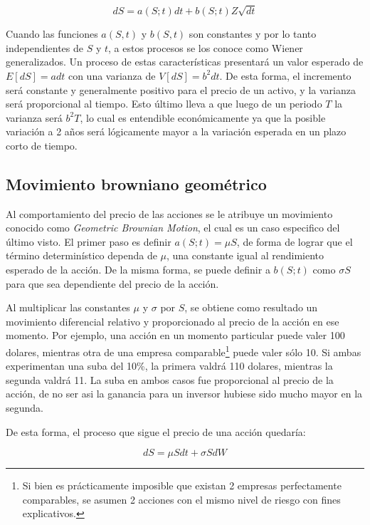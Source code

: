 \begin{equation}
	dS = a(S;t) dt + b(S;t) Z \sqrt{dt} \label{ito-dw}
\end{equation}

Cuando las funciones $a(S,t)$ y $b(S,t)$ son constantes y por lo tanto independientes de $S$ y $t$, a estos procesos se los conoce como Wiener generalizados. Un proceso de estas características presentará un valor esperado de $E[dS] = a dt$ con una varianza de $V[dS] = b^2 dt$. De esta forma, el incremento será constante y generalmente positivo para el precio de un activo, y la varianza será proporcional al tiempo. Esto último lleva a que luego de un periodo $T$ la varianza será $b^2 T$, lo cual es entendible económicamente ya que la posible variación a 2 años será lógicamente mayor a la variación esperada en un plazo corto de tiempo.



\subsection{Movimiento browniano geométrico}

Al comportamiento del precio de las acciones se le atribuye un movimiento conocido como \textit{Geometric Brownian Motion}, el cual es un caso especifico del último visto. El primer paso es definir $a(S;t) = \mu S$, de forma de lograr que el término determinístico dependa de $\mu$, una constante igual al rendimiento esperado de la acción. De la misma forma, se puede definir a $b(S;t)$ como $\sigma S$ para que sea dependiente del precio de la acción. 

Al multiplicar las constantes $\mu$ y $\sigma$ por $S$, se obtiene como resultado un movimiento diferencial relativo y proporcionado al precio de la acción en ese momento. Por ejemplo, una acción en un momento particular puede valer 100 dolares, mientras otra de una empresa comparable\footnote{Si bien es prácticamente imposible que existan 2 empresas perfectamente comparables, se asumen 2 acciones con el mismo nivel de riesgo con fines explicativos.} puede valer sólo 10. Si ambas experimentan una suba del 10\%, la primera valdrá 110 dolares, mientras la segunda valdrá 11. La suba en ambos casos fue proporcional al precio de la acción, de no ser asi la ganancia para un inversor hubiese sido mucho mayor en la segunda.

De esta forma, el proceso que sigue el precio de una acción quedaría:

\begin{equation}
dS = \mu S dt + \sigma S dW \label{brownianmotion}
\end{equation}


